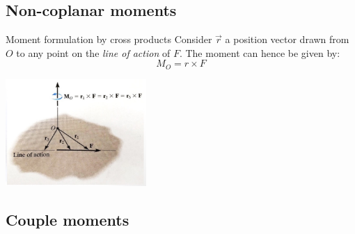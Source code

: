 \documentclass{article}
\begin{document}
\subsection{Non-coplanar moments}
\begin{definition}
  {Moment formulation by cross products}
  Consider $\vec{r}$ a position vector drawn from $O$ to any point on the \emph{line of action} of $F$. The moment can hence be given by:
  \[M_O=r\times F\]
  \begin{center}
    \includegraphics[width=0.4\textwidth]{img/Moment2.jpg}
  \end{center}
\end{definition}

\subsection{Couple moments}
\end{document}
